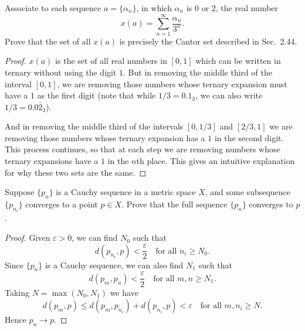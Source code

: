 Associate to each sequence $a = \{\alpha_n\}$, in which
$\alpha_n$ is $0$ or $2$, the real number
\begin{equation*}
  x(a) = \sum_{n=1}^\infty\frac{\alpha_n}{3^n}.
\end{equation*}
Prove that the set of all $x(a)$ is precisely the Cantor set described
in Sec.~2.44.
\begin{proof}
  $x(a)$ is the set of all real numbers in $[0,1]$ which can be
  written in ternary without using the digit $1$. But in removing the
  middle third of the interval $[0,1]$, we are removing those numbers
  whose ternary expansion must have a $1$ as the first digit (note
  that while $1/3 = 0.1_3$, we can also write $1/3 = 0.0\bar2_3$).

  And in removing the middle third of the intervals $[0,1/3]$ and
  $[2/3,1]$ we are removing those numbers whose ternary expansion has
  a $1$ in the second digit. This process continues, so that at each
  step we are removing numbers whose ternary expansions have a $1$ in
  the $n$th place. This gives an intuitive explanation for why these
  two sets are the same.
\end{proof}

 Suppose $\{p_n\}$ is a Cauchy sequence in a metric space
$X$, and some subsequence $\{p_{n_i}\}$ converges to a point $p\in
X$. Prove that the full sequence $\{p_n\}$ converges to $p$.
\begin{proof}
  Given $\varepsilon > 0$, we can find $N_0$ such that
  \begin{equation*}
    d(p_{n_i},p) < \frac\varepsilon2
    \quad\text{for all $n_i\geq N_0$}.
  \end{equation*}
  Since $\{p_n\}$ is a Cauchy sequence, we can also find $N_1$ such
  that
  \begin{equation*}
    d(p_m, p_n) < \frac\varepsilon2
    \quad\text{for all $m,n\geq N_1$}.
  \end{equation*}
  Taking $N = \max(N_0,N_1)$ we have
  \begin{equation*}
    d(p_m, p) \leq d(p_m, p_{n_i}) + d(p_{n_i}, p)
    < \varepsilon
    \quad\text{for all $m,n_i\geq N$}.
  \end{equation*}
  Hence $p_n\to p$.
\end{proof}


